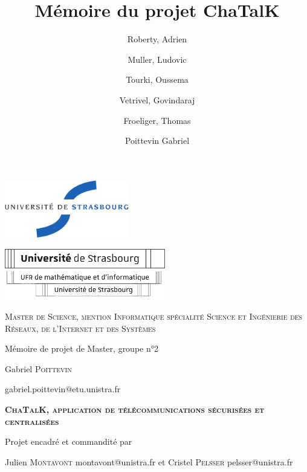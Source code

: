 \documentclass{ter}
\title{Mémoire du projet ChaTalK}
\author{
  Roberty, Adrien \and
  Muller, Ludovic \and
  Tourki, Oussema \and
  Vetrivel, Govindaraj \and
  Froeliger, Thomas \and
  Poittevin Gabriel
}
\begin{document}

\thispagestyle{empty}

\begin{center}
  \includegraphics[height=2.5cm]{logos/logo-uds-couleur.pdf}
  \vfill

  \includegraphics[width=7.0cm]{logos/logo-uds.pdf}\\

  \includegraphics[width=7.0cm]{logos/logo-ufr.pdf}
  \vfill
  \vfill

  {
  \large
  \textsc {
    Master de Science, mention Informatique
    spécialité Science et Ingénierie des Réseaux, de l'Internet
    et des Systèmes
  }
  }

  \bigskip

  {\large Mémoire de projet de Master, groupe n°2}

  \medskip

  {\large Gabriel \textsc {Poittevin}}

  {\small gabriel.poittevin@etu.unistra.fr}

  \vfill

  {
  \begin{spacing}{1.4}
  \huge
  \textsc {
  \textbf {
      ChaTalK, application de télécommunications sécurisées et centralisées
  }
  }
  \end{spacing}
  }

  \vfill

  {\large Projet encadré et commandité par}

  \medskip

  {\large Julien \textsc {Montavont}}
  {\small montavont@unistra.fr}
  et
  {\large Cristel \textsc {Pelsser}}
  {\small pelsser@unistra.fr}


\end{center}
\end{document}
